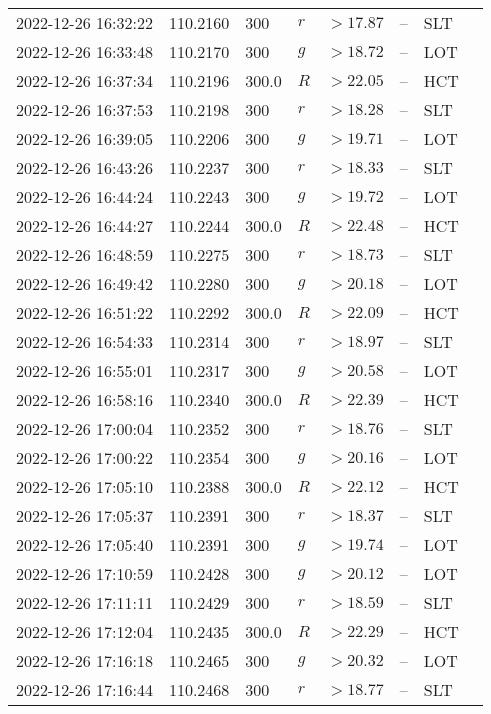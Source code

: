 \documentclass{nature_plusfigure}
\begin{document}
\begin{supplement}
\begin{center}
\begin{longtable}{llllllll}
2022-12-26 16:32:22 & 110.2160 & 300 & $r$ & $>17.87$ & -- & SLT &  \\ 
2022-12-26 16:33:48 & 110.2170 & 300 & $g$ & $>18.72$ & -- & LOT &  \\ 
2022-12-26 16:37:34 & 110.2196 & 300.0 & $R$ & $>22.05$ & -- & HCT &  \\ 
2022-12-26 16:37:53 & 110.2198 & 300 & $r$ & $>18.28$ & -- & SLT &  \\ 
2022-12-26 16:39:05 & 110.2206 & 300 & $g$ & $>19.71$ & -- & LOT &  \\ 
2022-12-26 16:43:26 & 110.2237 & 300 & $r$ & $>18.33$ & -- & SLT &  \\ 
2022-12-26 16:44:24 & 110.2243 & 300 & $g$ & $>19.72$ & -- & LOT &  \\ 
2022-12-26 16:44:27 & 110.2244 & 300.0 & $R$ & $>22.48$ & -- & HCT &  \\ 
2022-12-26 16:48:59 & 110.2275 & 300 & $r$ & $>18.73$ & -- & SLT &  \\ 
2022-12-26 16:49:42 & 110.2280 & 300 & $g$ & $>20.18$ & -- & LOT &  \\ 
2022-12-26 16:51:22 & 110.2292 & 300.0 & $R$ & $>22.09$ & -- & HCT &  \\ 
2022-12-26 16:54:33 & 110.2314 & 300 & $r$ & $>18.97$ & -- & SLT &  \\ 
2022-12-26 16:55:01 & 110.2317 & 300 & $g$ & $>20.58$ & -- & LOT &  \\ 
2022-12-26 16:58:16 & 110.2340 & 300.0 & $R$ & $>22.39$ & -- & HCT &  \\ 
2022-12-26 17:00:04 & 110.2352 & 300 & $r$ & $>18.76$ & -- & SLT &  \\ 
2022-12-26 17:00:22 & 110.2354 & 300 & $g$ & $>20.16$ & -- & LOT &  \\ 
2022-12-26 17:05:10 & 110.2388 & 300.0 & $R$ & $>22.12$ & -- & HCT &  \\ 
2022-12-26 17:05:37 & 110.2391 & 300 & $r$ & $>18.37$ & -- & SLT &  \\ 
2022-12-26 17:05:40 & 110.2391 & 300 & $g$ & $>19.74$ & -- & LOT &  \\ 
2022-12-26 17:10:59 & 110.2428 & 300 & $g$ & $>20.12$ & -- & LOT &  \\ 
2022-12-26 17:11:11 & 110.2429 & 300 & $r$ & $>18.59$ & -- & SLT &  \\ 
2022-12-26 17:12:04 & 110.2435 & 300.0 & $R$ & $>22.29$ & -- & HCT &  \\ 
2022-12-26 17:16:18 & 110.2465 & 300 & $g$ & $>20.32$ & -- & LOT &  \\ 
2022-12-26 17:16:44 & 110.2468 & 300 & $r$ & $>18.77$ & -- & SLT &  \\ 

\end{longtable}
\end{center}
\end{supplement}
\end{document}
